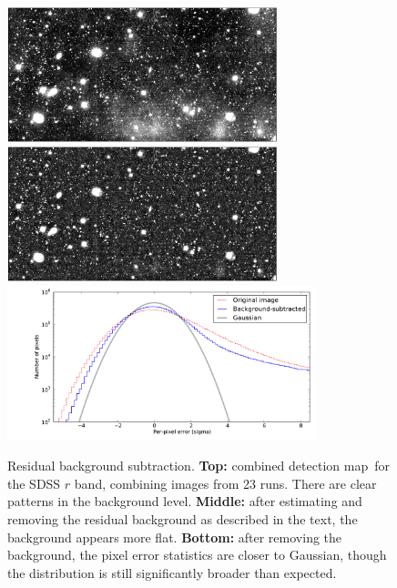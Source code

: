 \documentclass[letterpaper,preprint]{aastex62}
\newcommand{\detmap}{detection map}
\begin{document}
\begin{figure}
\begin{center}
\includegraphics[width=0.7\textwidth]{detect-r-00} \\
\includegraphics[width=0.7\textwidth]{detect-r-01} \\
\includegraphics[width=0.8\textwidth]{detect-r-02}
\caption{Residual background subtraction.  \textbf{Top:} combined
  \detmap\ for the SDSS $r$ band, combining images from 23 runs.
  There are clear patterns in the background level.  \textbf{Middle:}
  after estimating and removing the residual background as described
  in the text, the background appears more flat.  \textbf{Bottom:}
  after removing the background, the pixel error statistics are closer
  to Gaussian, though the distribution is still significantly
  broader than expected.\label{fig:bg}}
\end{center}
\end{figure}
\end{document}
